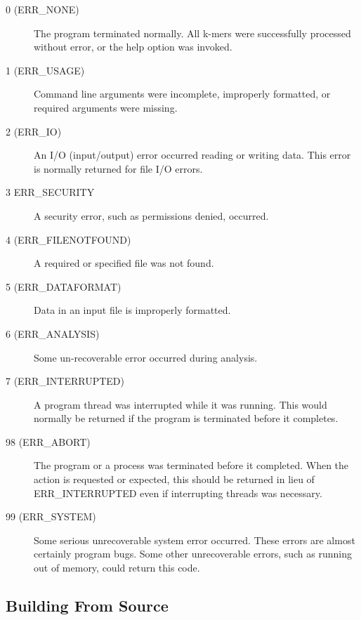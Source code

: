 \begin{description}
\item[0 (ERR\_NONE)] The program terminated normally. All k-mers were successfully processed without error, or the help option was invoked.

\item[1 (ERR\_USAGE)] Command line arguments were incomplete, improperly formatted, or required arguments were missing.

\item[2 (ERR\_IO)] An I/O (input/output) error occurred reading or writing data. This error is normally returned for file I/O errors.

\item[3 ERR\_SECURITY] A security error, such as permissions denied, occurred.

\item[4 (ERR\_FILENOTFOUND)] A required or specified file was not found.

\item[5 (ERR\_DATAFORMAT)] Data in an input file is improperly formatted. 

\item[6 (ERR\_ANALYSIS)] Some un-recoverable error occurred during analysis.

\item[7 (ERR\_INTERRUPTED)] A program thread was interrupted while it was running. This would normally be returned if the program is terminated before it completes.

\item[98 (ERR\_ABORT)] The program or a process was terminated before it completed. When the action is requested or expected, this should be returned in lieu of ERR\_INTERRUPTED even if interrupting threads was necessary.

\item[99 (ERR\_SYSTEM)] Some serious unrecoverable system error occurred. These errors are almost certainly program bugs. Some other unrecoverable errors, such as running out of memory, could return this code.

\end{description}


\subsection{Building From Source}
\label{sec.suppl.building}

